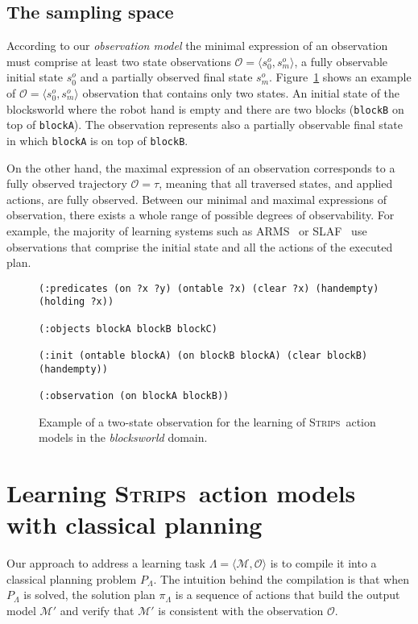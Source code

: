 \documentclass[runningheads]{llncs}
\newcommand{\tup}[1]{{\langle #1 \rangle}}
\newcommand{\strips}{\textsc{Strips}}     %
\begin{document}
\subsection{The sampling space}
According to our {\em observation model} the minimal expression of an observation must comprise at least two state observations $\mathcal{O}=\tup{s_0^o,s_m^o}$, a fully observable initial state $s_0^o$ and a partially observed final state $s_m^o$. Figure~\ref{fig:observation} shows an example of $\mathcal{O}=\tup{s_0^o,s_m^o}$ observation that contains only two states. An initial state of the blocksworld where the robot hand is empty and there are two blocks ({\tt\small{blockB}} on top of  {\tt\small{blockA}}). The observation represents also a partially observable final state in which {\tt\small{blockA}} is on top of {\tt\small{blockB}}.

On the other hand, the maximal expression of an observation corresponds to a fully observed trajectory $\mathcal{O}=\tau$, meaning that all traversed states, and applied actions, are fully observed. Between our minimal and maximal expressions of observation, there exists a whole range of possible degrees of observability. For example, the majority of learning systems such as {\sc ARMS}~\cite{yang2007learning} or {\sc SLAF}~\cite{amir:alearning:JAIR08} use observations that comprise the initial state and all the actions of the executed plan.


\begin{figure}[hbt!]
  \begin{small}
  \begin{verbatim}
(:predicates (on ?x ?y) (ontable ?x) (clear ?x) (handempty) (holding ?x))

(:objects blockA blockB blockC)

(:init (ontable blockA) (on blockB blockA) (clear blockB) (handempty))

(:observation (on blockA blockB))
  \end{verbatim}
  \end{small}
	\caption{\small Example of a two-state observation for the learning of \strips\ action models in the {\em blocksworld} domain.}
	\label{fig:observation}
\end{figure}



\section{Learning \strips\ action models with classical planning}
Our approach to address a learning task $\Lambda=\tup{\mathcal{M},{\mathcal O}}$ is to compile it into a classical planning problem $P_{\Lambda}$. The intuition behind the compilation is that when $P_{\Lambda}$ is solved, the solution plan $\pi_\Lambda$ is a sequence of actions that build the output model $\mathcal{M'}$ and verify that $\mathcal{M'}$ is consistent with the observation ${\mathcal O}$.
\end{document}
